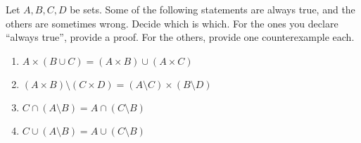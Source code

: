 \documentclass[12pt]{article}
\begin{document}
\begin{problem}
    Let $A, B, C, D$ be sets.
    Some of the following statements are always true, and the others are sometimes wrong.
    Decide which is which.
    For the ones you declare ``always true'', provide a proof.
    For the others, provide one counterexample each.
    \begin{enumerate}[label=(\alph*)]
        \item $A \times (B \cup C) = (A \times B) \cup (A \times C)$
        \item $(A \times B) \setminus (C \times D) = (A \setminus C) \times (B \setminus D)$
        \item $C \cap (A \setminus B) = A \cap (C \setminus B)$
        \item $C \cup (A \setminus B) = A \cup (C \setminus B)$
    \end{enumerate}
\end{problem}
\end{document}
